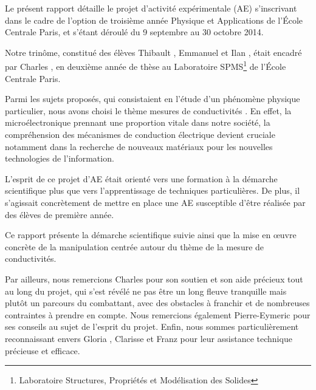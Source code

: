 Le présent rapport détaille le projet d'activité expérimentale (AE) s'inscrivant dans le cadre de l'option de troisième année 
\og Physique et Applications \fg{} de l'École Centrale Paris, et s'étant déroulé du 9 septembre au 30 octobre 2014.

\bigskip
Notre trinôme, constitué des élèves Thibault , Emmanuel  et Ilan , était encadré 
par Charles , en deuxième année de thèse au Laboratoire SPMS\footnote{Laboratoire Structures, 
Propriétés et Modélisation des Solides} de l'École Centrale Paris.

\bigskip
Parmi les sujets proposés, qui consistaient en l'étude d'un phénomène physique particulier, nous avons choisi le thème 
\og mesures de conductivités \fg. En effet, la microélectronique prennant une proportion vitale dans notre société, 
la compréhension des mécanismes de conduction électrique devient cruciale notamment dans 
la recherche de nouveaux matériaux pour les nouvelles technologies de l'information.

\bigskip
L'esprit de ce projet d'AE était orienté vers une formation à la démarche scientifique plus que vers l'apprentissage
de techniques particulières. De plus, il s'agissait concrètement de mettre en place une AE susceptible d'être réalisée
par des élèves de première année.

\bigskip
Ce rapport présente la démarche scientifique suivie ainsi que la mise en \oe uvre concrète de la manipulation
centrée autour du thème de la mesure de conductivités.

\bigskip
Par ailleurs, nous remercions Charles  pour son soutien et son aide précieux tout au long du projet, 
qui s'est révélé ne pas être un long fleuve tranquille mais plutôt un parcours du combattant, avec des obstacles à
franchir et de nombreuses contraintes à prendre en compte. 
Nous remercions également Pierre-Eymeric  pour ses conseils au sujet de l'esprit du projet. 
Enfin, nous sommes particulièrement reconnaissant envers Gloria , Clarisse  et Franz 
 pour leur assistance technique précieuse et efficace.


